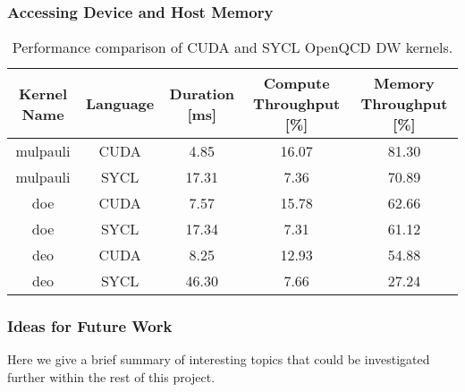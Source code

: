 \subsubsection{Accessing Device and Host Memory}


\begin{center}
	\begin{table}
		\begin{tabular}{||c c c c c||}
			\hline
			Kernel Name & Language & Duration [ms] & Compute Throughput [\%] & Memory Throughput [\%] \\
			\hline\hline
			mulpauli    & CUDA     & 4.85          & 16.07                   & 81.30                  \\
			\hline
			mulpauli    & SYCL     & 17.31         & 7.36                    & 70.89                  \\
			\hline
			doe         & CUDA     & 7.57          & 15.78                   & 62.66                  \\
			\hline
			doe         & SYCL     & 17.34         & 7.31                    & 61.12                  \\
			\hline
			deo         & CUDA     & 8.25          & 12.93                   & 54.88                  \\
			\hline
			deo         & SYCL     & 46.30         & 7.66                    & 27.24                  \\
			\hline
		\end{tabular}
		\caption{\label{tab:openqcd_perf}Performance comparison of CUDA and SYCL OpenQCD DW kernels.}
	\end{table}
\end{center}


\subsubsection{Ideas for Future Work}

Here we give a brief summary of interesting topics that could be investigated further within the rest of this project.

